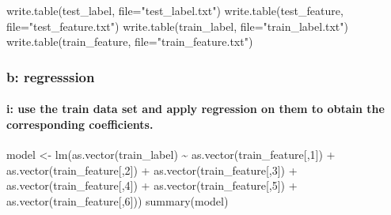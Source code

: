 \documentclass[
]{article}
\newenvironment{Shaded}{\begin{snugshade}}{\end{snugshade}}
\newcommand{\AttributeTok}[1]{\textcolor[rgb]{0.77,0.63,0.00}{#1}}
\newcommand{\DecValTok}[1]{\textcolor[rgb]{0.00,0.00,0.81}{#1}}
\newcommand{\FunctionTok}[1]{\textcolor[rgb]{0.00,0.00,0.00}{#1}}
\newcommand{\NormalTok}[1]{#1}
\newcommand{\OtherTok}[1]{\textcolor[rgb]{0.56,0.35,0.01}{#1}}
\newcommand{\SpecialCharTok}[1]{\textcolor[rgb]{0.00,0.00,0.00}{#1}}
\newcommand{\StringTok}[1]{\textcolor[rgb]{0.31,0.60,0.02}{#1}}
\begin{document}
\begin{Shaded}
\begin{Highlighting}[]
\FunctionTok{write.table}\NormalTok{(test\_label, }\AttributeTok{file=}\StringTok{"test\_label.txt"}\NormalTok{)}
\FunctionTok{write.table}\NormalTok{(test\_feature, }\AttributeTok{file=}\StringTok{"test\_feature.txt"}\NormalTok{)}
\FunctionTok{write.table}\NormalTok{(train\_label, }\AttributeTok{file=}\StringTok{"train\_label.txt"}\NormalTok{)}
\FunctionTok{write.table}\NormalTok{(train\_feature, }\AttributeTok{file=}\StringTok{"train\_feature.txt"}\NormalTok{)}
\end{Highlighting}
\end{Shaded}

\hypertarget{b-regresssion}{%
\subsubsection{b: regresssion}\label{b-regresssion}}

\hypertarget{i-use-the-train-data-set-and-apply-regression-on-them-to-obtain-the-corresponding-coefficients.}{%
\paragraph{i: use the train data set and apply regression on them to
obtain the corresponding
coefficients.}\label{i-use-the-train-data-set-and-apply-regression-on-them-to-obtain-the-corresponding-coefficients.}}

\begin{Shaded}
\begin{Highlighting}[]
\NormalTok{model }\OtherTok{\textless{}{-}} \FunctionTok{lm}\NormalTok{(}\FunctionTok{as.vector}\NormalTok{(train\_label) }\SpecialCharTok{\textasciitilde{}}  \FunctionTok{as.vector}\NormalTok{(train\_feature[,}\DecValTok{1}\NormalTok{]) }\SpecialCharTok{+} \FunctionTok{as.vector}\NormalTok{(train\_feature[,}\DecValTok{2}\NormalTok{]) }\SpecialCharTok{+} \FunctionTok{as.vector}\NormalTok{(train\_feature[,}\DecValTok{3}\NormalTok{]) }\SpecialCharTok{+} \FunctionTok{as.vector}\NormalTok{(train\_feature[,}\DecValTok{4}\NormalTok{]) }\SpecialCharTok{+} \FunctionTok{as.vector}\NormalTok{(train\_feature[,}\DecValTok{5}\NormalTok{]) }\SpecialCharTok{+} \FunctionTok{as.vector}\NormalTok{(train\_feature[,}\DecValTok{6}\NormalTok{]))}
\FunctionTok{summary}\NormalTok{(model)}
\end{Highlighting}
\end{Shaded}
\end{document}
